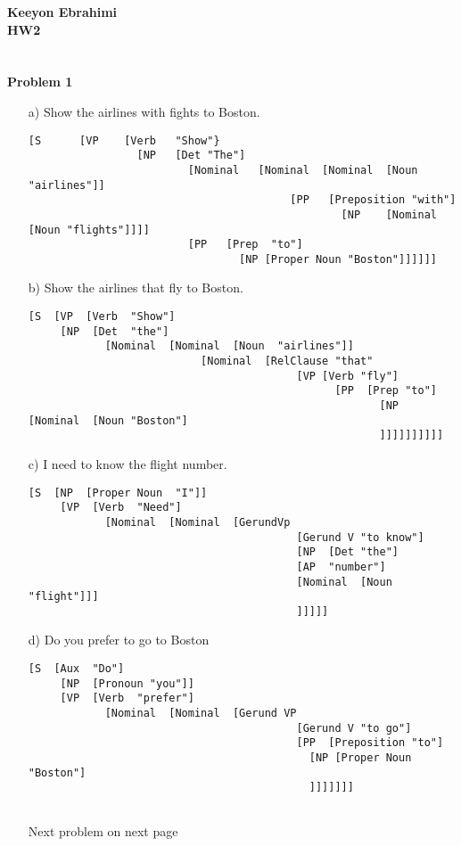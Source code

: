 \documentclass[ruled]{article}
\begin{document}
\textbf{Keeyon Ebrahimi}\\
\textbf{HW2}\\ \\ \\
\textbf{Problem 1}
\begin{itemize}
\item[a) ] Show the airlines with fights to Boston.
\begin{verbatim}
[S	    [VP    [Verb   "Show"}
                 [NP   [Det "The"]
                         [Nominal   [Nominal  [Nominal  [Noun "airlines"]]
                                         [PP   [Preposition "with"] 
                                                 [NP	[Nominal [Noun "flights"]]]]
                         [PP   [Prep  "to"]
                                 [NP [Proper Noun "Boston"]]]]]]
\end{verbatim}

\item[b) ] Show the airlines that fly to Boston.
\begin{verbatim}
[S  [VP  [Verb  "Show"]
     [NP  [Det  "the"]
            [Nominal  [Nominal  [Noun  "airlines"]]
                           [Nominal  [RelClause "that"
                                          [VP [Verb "fly"]
                                                [PP  [Prep "to"]
                                                       [NP  [Nominal  [Noun "Boston"]
                                                       ]]]]]]]]]]
\end{verbatim}
\item[c)  ]  I need to know the flight number.
\begin{verbatim}
[S  [NP  [Proper Noun  "I"]]
     [VP  [Verb  "Need"]
            [Nominal  [Nominal  [GerundVp
                                          [Gerund V "to know"]
                                          [NP  [Det "the"]
                                          [AP  "number"]
                                          [Nominal  [Noun "flight"]]]
                                          ]]]]]
\end{verbatim}
\item[d)  ]  Do you prefer to go to Boston
\begin{verbatim}
[S  [Aux  "Do"]
     [NP  [Pronoun "you"]]
     [VP  [Verb  "prefer"]
            [Nominal  [Nominal  [Gerund VP
                                          [Gerund V "to go"]
                                          [PP  [Preposition "to"]
                                            [NP [Proper Noun "Boston"]
                                            ]]]]]]]
                                          
\end{verbatim}
Next problem on next page
\newpage
\end{itemize}
\end{document}
